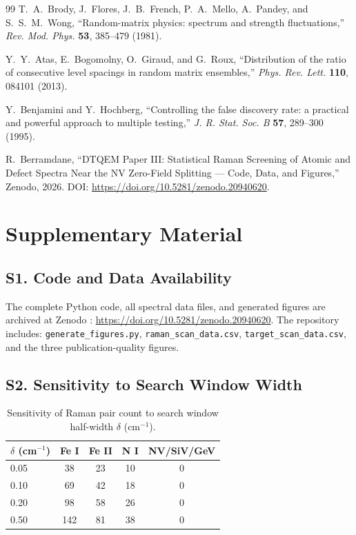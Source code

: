 \documentclass[11pt,a4paper]{article}
\begin{document}
\begin{thebibliography}{99}
T.~A.~Brody, J.~Flores, J.~B.~French, P.~A.~Mello, A.~Pandey, and S.~S.~M.~Wong,
``Random-matrix physics: spectrum and strength fluctuations,''
\textit{Rev. Mod. Phys.} \textbf{53}, 385--479 (1981).

Y.~Y.~Atas, E.~Bogomolny, O.~Giraud, and G.~Roux,
``Distribution of the ratio of consecutive level spacings in random matrix ensembles,''
\textit{Phys. Rev. Lett.} \textbf{110}, 084101 (2013).

Y.~Benjamini and Y.~Hochberg,
``Controlling the false discovery rate: a practical and powerful approach to multiple testing,''
\textit{J. R. Stat. Soc. B} \textbf{57}, 289--300 (1995).

R.~Berramdane,
``DTQEM Paper III: Statistical Raman Screening of Atomic and Defect Spectra Near the NV Zero-Field Splitting --- Code, Data, and Figures,''
Zenodo, 2026. DOI: \url{https://doi.org/10.5281/zenodo.20940620}.

\end{thebibliography}

\clearpage
\onecolumn
\section*{Supplementary Material}
\label{sec:supp}

\subsection*{S1. Code and Data Availability}
The complete Python code, all spectral data files, and generated figures are archived at Zenodo \cite{Zenodo2026}: \url{https://doi.org/10.5281/zenodo.20940620}. The repository includes: \texttt{generate\_figures.py}, \texttt{raman\_scan\_data.csv}, \texttt{target\_scan\_data.csv}, and the three publication-quality figures.

\subsection*{S2. Sensitivity to Search Window Width}
\begin{table}[h]
\centering
\caption{Sensitivity of Raman pair count to search window half-width $\delta$ (cm$^{-1}$).}
\small
\begin{tabular}{@{}lcccc@{}}
\toprule
$\delta$ (cm$^{-1}$) & Fe I & Fe II & N I & NV/SiV/GeV \\
\midrule
0.05 & 38 & 23 & 10 & 0 \\
0.10 & 69 & 42 & 18 & 0 \\
0.20 & 98 & 58 & 26 & 0 \\
0.50 & 142 & 81 & 38 & 0 \\
\bottomrule
\end{tabular}
\end{table}
\end{document}
